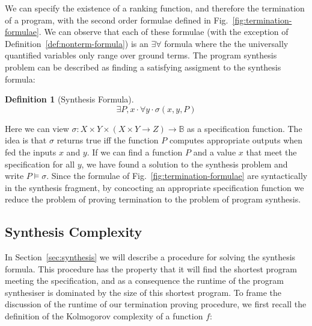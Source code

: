 \documentclass[preprint]{sigplanconf}
\theoremstyle{definition}
\newtheorem{definition}[theorem]{Definition}
\begin{document}
\iffalse
Many loops do not terminate for all starting states, but are contained in programs that guarantee the loop will
terminate.  Traditional termination provers have difficulty reasoning about such conditionally-terminating loops.
We are able to handle such loops by computing \emph{termination invariants}.  This mechanism also allows us to
prove that programs with multiple loops terminate, even if the termination of some loop depends on the states
reachable after leaving a previous loop.

Our method for ranking function synthesis can be stated as follows:
discuss what spec is used (non-lexicographic vs lexicographic) + the completeness claims.
Any termination guarantees?  
\fi

We can specify the existence of a ranking function, and therefore the termination
of a program, with the second order formulae defined in Fig.~\ref{fig:termination-formulae}.
We can observe that each of these formulae (with the exception of Definition~\ref{def:nonterm-formula})
is an $\exists \forall$ formula where the the universally quantified variables only range over
ground terms.
The program synthesis problem can be described as finding a satisfying assigment to the
synthesis formula:

\begin{definition}[Synthesis Formula]
 \label{def:synth-formula}
 $$\exists P, x \cdot \forall y \cdot \sigma(x, y, P)$$
\end{definition}

Here we can view $\sigma: X \times Y \times (X \times Y \to Z) \to \mathbb{B}$ as a specification function.
The idea is that $\sigma$ returns true iff the function $P$ computes appropriate outputs
when fed the inputs $x$ and $y$.  If we can find a function $P$ and a value $x$ that meet the specification
for all $y$, we have found a solution to the synthesis problem and write $P \models \sigma$.  Since the formulae
of Fig.~\ref{fig:termination-formulae} are syntactically in the synthesis fragment, by concocting an appropriate
specification function we reduce the problem of proving termination to the problem of
program synthesis.

\subsection{Synthesis Complexity}
In Section~\ref{sec:synthesis} we will describe a procedure for solving the synthesis formula.
This procedure has the property that it will find the shortest program meeting the
specification, and as a consequence the runtime of the program synthesiser is dominated
by the size of this shortest program.  To frame the discussion of the runtime of our
termination proving procedure, we first recall the definition of the Kolmogorov complexity
of a function $f$:
\end{document}
